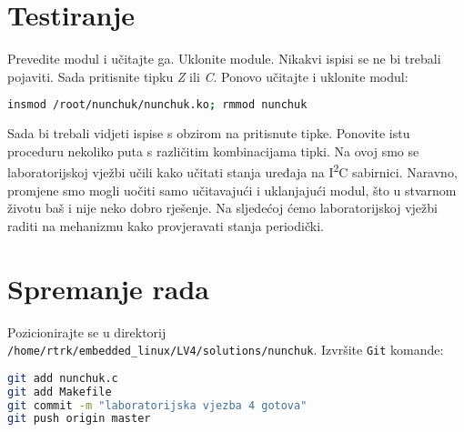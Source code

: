 \documentclass[11pt]{article}
\begin{document}
\section{Testiranje}
Prevedite modul i učitajte ga. Uklonite module. Nikakvi ispisi se ne bi trebali
pojaviti. Sada pritisnite tipku \textit{Z} ili \textit{C}. Ponovo učitajte i
uklonite modul:
\begin{lstlisting}[language=bash]
insmod /root/nunchuk/nunchuk.ko; rmmod nunchuk
\end{lstlisting}
Sada bi trebali vidjeti ispise s obzirom na pritisnute tipke. Ponovite istu
proceduru nekoliko puta s različitim kombinacijama tipki.
\newline
\newline
Na ovoj smo se laboratorijskoj vježbi učili kako učitati stanja uređaja na
I\textsuperscript{2}C sabirnici. Naravno, promjene smo mogli uočiti samo
učitavajući i uklanjajući modul, što u stvarnom životu baš i nije neko dobro
rješenje. Na sljedećoj ćemo laboratorijskoj vježbi raditi na mehanizmu kako
provjeravati stanja periodički.

\section{Spremanje rada}
Pozicionirajte se u direktorij \texttt{/home/rtrk/embedded\_linux/LV4/solutions/nunchuk}.
Izvršite \texttt{Git} komande:
\begin{lstlisting}[language=bash]
git add nunchuk.c
git add Makefile
git commit -m "laboratorijska vjezba 4 gotova"
git push origin master
\end{lstlisting}
\end{document}
